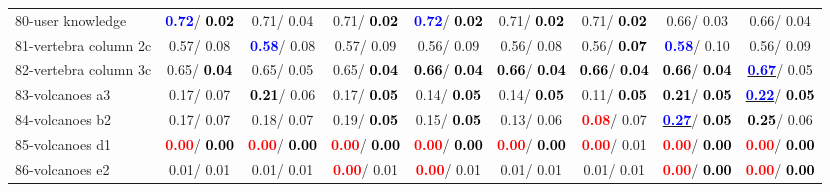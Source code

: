 \begin{table}[h]
\begin{center}
\begin{tabular}{lc|c|c|c|c|c|c|c}
80-user knowledge & \textcolor{blue}{\textbf{  0.72}}/\textcolor{black}{\textbf{  0.02}} &   0.71/  0.04 &   0.71/\textcolor{black}{\textbf{  0.02}} & \textcolor{blue}{\textbf{  0.72}}/\textcolor{black}{\textbf{  0.02}} &   0.71/\textcolor{black}{\textbf{  0.02}} &   0.71/\textcolor{black}{\textbf{  0.02}} &   0.66/  0.03 &   0.66/  0.04 \\
81-vertebra column 2c &   0.57/  0.08 & \textcolor{blue}{\textbf{  0.58}}/  0.08 &   0.57/  0.09 &   0.56/  0.09 &   0.56/  0.08 &   0.56/\textcolor{black}{\textbf{  0.07}} & \textcolor{blue}{\textbf{  0.58}}/  0.10 &   0.56/  0.09 \\
82-vertebra column 3c &   0.65/\textcolor{black}{\textbf{  0.04}} &   0.65/  0.05 &   0.65/\textcolor{black}{\textbf{  0.04}} & \textcolor{black}{\textbf{  0.66}}/\textcolor{black}{\textbf{  0.04}} & \textcolor{black}{\textbf{  0.66}}/\textcolor{black}{\textbf{  0.04}} & \textcolor{black}{\textbf{  0.66}}/\textcolor{black}{\textbf{  0.04}} & \textcolor{black}{\textbf{  0.66}}/\textcolor{black}{\textbf{  0.04}} & \underline{\textcolor{blue}{\textbf{  0.67}}}/  0.05 \\
83-volcanoes a3 &   0.17/  0.07 & \textcolor{black}{\textbf{  0.21}}/  0.06 &   0.17/\textcolor{black}{\textbf{  0.05}} &   0.14/\textcolor{black}{\textbf{  0.05}} &   0.14/\textcolor{black}{\textbf{  0.05}} &   0.11/\textcolor{black}{\textbf{  0.05}} & \textcolor{black}{\textbf{  0.21}}/\textcolor{black}{\textbf{  0.05}} & \underline{\textcolor{blue}{\textbf{  0.22}}}/\textcolor{black}{\textbf{  0.05}} \\
84-volcanoes b2 &   0.17/  0.07 &   0.18/  0.07 &   0.19/\textcolor{black}{\textbf{  0.05}} &   0.15/\textcolor{black}{\textbf{  0.05}} &   0.13/  0.06 & \textcolor{red}{\textbf{  0.08}}/  0.07 & \underline{\textcolor{blue}{\textbf{  0.27}}}/\textcolor{black}{\textbf{  0.05}} & \textcolor{black}{\textbf{  0.25}}/  0.06 \\
85-volcanoes d1 & \textcolor{red}{\textbf{  0.00}}/\textcolor{black}{\textbf{  0.00}} & \textcolor{red}{\textbf{  0.00}}/\textcolor{black}{\textbf{  0.00}} & \textcolor{red}{\textbf{  0.00}}/\textcolor{black}{\textbf{  0.00}} & \textcolor{red}{\textbf{  0.00}}/\textcolor{black}{\textbf{  0.00}} & \textcolor{red}{\textbf{  0.00}}/\textcolor{black}{\textbf{  0.00}} & \textcolor{red}{\textbf{  0.00}}/  0.01 & \textcolor{red}{\textbf{  0.00}}/\textcolor{black}{\textbf{  0.00}} & \textcolor{red}{\textbf{  0.00}}/\textcolor{black}{\textbf{  0.00}} \\ \hline
86-volcanoes e2 &   0.01/  0.01 &   0.01/  0.01 & \textcolor{red}{\textbf{  0.00}}/  0.01 & \textcolor{red}{\textbf{  0.00}}/  0.01 &   0.01/  0.01 &   0.01/  0.01 & \textcolor{red}{\textbf{  0.00}}/\textcolor{black}{\textbf{  0.00}} & \textcolor{red}{\textbf{  0.00}}/\textcolor{black}{\textbf{  0.00}} \\

\end{tabular}
\end{center}
\end{table}
